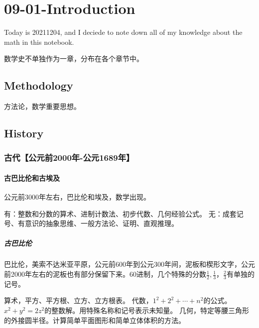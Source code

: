 

\chapter{09-01-Introduction}
Today is 20211204, and I deciede to note down all of my knowledge about the math in this notebook.


数学史不单独作为一章，分布在各个章节中。

\section{Methodology}
方法论，数学重要思想。


\section{History}

\subsection{古代【公元前2000年-公元1689年】}


\subsubsection{古巴比伦和古埃及}

公元前3000年左右，巴比伦和埃及，数学出现。

有：整数和分数的算术、进制计数法、初步代数、几何经验公式。
无：成套记号、有意识的抽象思维、一般方法论、证明、直观推理。


\paragraph{古巴比伦}

巴比伦，美索不达米亚平原，公元前600年到公元300年间，泥板和楔形文字，公元前2000年左右的泥板也有部分保留下来。60进制，几个特殊的分数$\frac{1}{2},\frac{1}{3}，\frac{2}{3}$有单独的记号。

算术，平方、平方根、立方、立方根表。
代数，$1^2 + 2^2 + \cdots + n^2$的公式。$x^2 + y^2 = 2z^2$的整数解。用特殊名称和记号表示未知量。
几何，特定等腰三角形的外接圆半径。计算简单平面图形和简单立体体积的方法。

